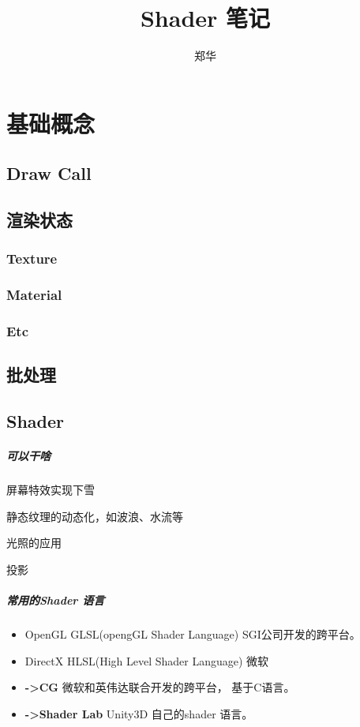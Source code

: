 \documentclass[UTF8,a4paper,12pt]{ctexbook}
\author{\kaishu 郑华}
\title{\heiti Shader 笔记}
\begin{document}
 	\maketitle
	\tableofcontents 
	
	
	

\chapter{基础概念}
	\section{Draw Call}
		

	\section{渲染状态}
		\subsection{Texture}
		
		\subsection{Material}
		
		\subsection{Etc}
	
	
	\section{批处理}
	
	
	\section{Shader}
		\paragraph{可以干啥}
		
		屏幕特效实现下雪
		
		静态纹理的动态化，如波浪、水流等
		
		光照的应用
		
		投影
		
			
		\paragraph{常用的Shader 语言}
			\begin{itemize}
				\item OpenGL GLSL(opengGL Shader Language) SGI公司开发的跨平台。
				\item DirectX  HLSL(High Level Shader Language) 微软
				\item \textbf{->CG} 微软和英伟达联合开发的跨平台， 基于C语言。
				\item \textbf{->Shader Lab} Unity3D 自己的shader 语言。
			\end{itemize}
\end{document}
